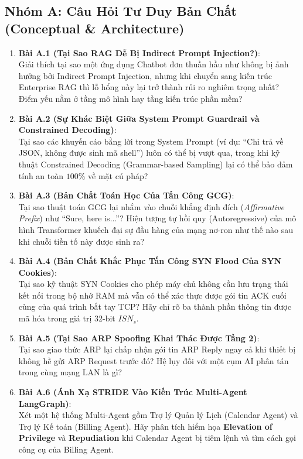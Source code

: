 \subsection{Nhóm A: Câu Hỏi Tư Duy Bản Chất (Conceptual \& Architecture)}
\begin{enumerate}
  \item \textbf{Bài A.1 (Tại Sao RAG Dễ Bị Indirect Prompt Injection?)}: \\
  Giải thích tại sao một ứng dụng Chatbot đơn thuần hầu như không bị ảnh hưởng bởi Indirect Prompt Injection, nhưng khi chuyển sang kiến trúc Enterprise RAG thì lỗ hổng này lại trở thành rủi ro nghiêm trọng nhất? Điểm yếu nằm ở tầng mô hình hay tầng kiến trúc phần mềm?

  \item \textbf{Bài A.2 (Sự Khác Biệt Giữa System Prompt Guardrail và Constrained Decoding)}: \\
  Tại sao các khuyến cáo bằng lời trong System Prompt (ví dụ: ``Chỉ trả về JSON, không được sinh mã shell'') luôn có thể bị vượt qua, trong khi kỹ thuật Constrained Decoding (Grammar-based Sampling) lại có thể bảo đảm tính an toàn $100\%$ về mặt cú pháp?

  \item \textbf{Bài A.3 (Bản Chất Toán Học Của Tấn Công GCG)}: \\
  Tại sao thuật toán GCG lại nhắm vào chuỗi khẳng định đích (\textit{Affirmative Prefix}) như ``Sure, here is...''? Hiện tượng tự hồi quy (Autoregressive) của mô hình Transformer khuếch đại sự đầu hàng của mạng nơ-ron như thế nào sau khi chuỗi tiền tố này được sinh ra?

  \item \textbf{Bài A.4 (Bản Chất Khắc Phục Tấn Công SYN Flood Của SYN Cookies)}: \\
  Tại sao kỹ thuật SYN Cookies cho phép máy chủ không cần lưu trạng thái kết nối trong bộ nhớ RAM mà vẫn có thể xác thực được gói tin ACK cuối cùng của quá trình bắt tay TCP? Hãy chỉ rõ ba thành phần thông tin được mã hóa trong giá trị 32-bit $ISN_s$.

  \item \textbf{Bài A.5 (Tại Sao ARP Spoofing Khai Thác Được Tầng 2)}: \\
  Tại sao giao thức ARP lại chấp nhận gói tin ARP Reply ngay cả khi thiết bị không hề gửi ARP Request trước đó? Hệ lụy đối với một cụm AI phân tán trong cùng mạng LAN là gì?

  \item \textbf{Bài A.6 (Ánh Xạ STRIDE Vào Kiến Trúc Multi-Agent LangGraph)}: \\
  Xét một hệ thống Multi-Agent gồm Trợ lý Quản lý Lịch (Calendar Agent) và Trợ lý Kế toán (Billing Agent). Hãy phân tích hiểm họa \textbf{Elevation of Privilege} và \textbf{Repudiation} khi Calendar Agent bị tiêm lệnh và tìm cách gọi công cụ của Billing Agent.


\end{enumerate}
